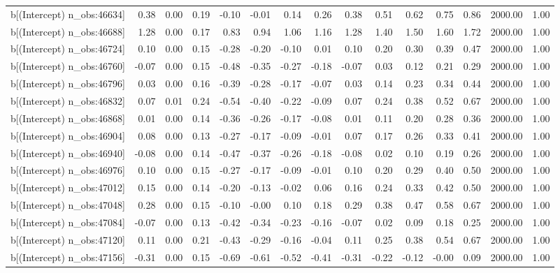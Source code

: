\begin{table}[ht]
\begin{tabular}{rrrrrrrrrrrrrrr}
  b[(Intercept) n\_obs:46634] & 0.38 & 0.00 & 0.19 & -0.10 & -0.01 & 0.14 & 0.26 & 0.38 & 0.51 & 0.62 & 0.75 & 0.86 & 2000.00 & 1.00 \\ 
  b[(Intercept) n\_obs:46688] & 1.28 & 0.00 & 0.17 & 0.83 & 0.94 & 1.06 & 1.16 & 1.28 & 1.40 & 1.50 & 1.60 & 1.72 & 2000.00 & 1.00 \\ 
  b[(Intercept) n\_obs:46724] & 0.10 & 0.00 & 0.15 & -0.28 & -0.20 & -0.10 & 0.01 & 0.10 & 0.20 & 0.30 & 0.39 & 0.47 & 2000.00 & 1.00 \\ 
  b[(Intercept) n\_obs:46760] & -0.07 & 0.00 & 0.15 & -0.48 & -0.35 & -0.27 & -0.18 & -0.07 & 0.03 & 0.12 & 0.21 & 0.29 & 2000.00 & 1.00 \\ 
  b[(Intercept) n\_obs:46796] & 0.03 & 0.00 & 0.16 & -0.39 & -0.28 & -0.17 & -0.07 & 0.03 & 0.14 & 0.23 & 0.34 & 0.44 & 2000.00 & 1.00 \\ 
  b[(Intercept) n\_obs:46832] & 0.07 & 0.01 & 0.24 & -0.54 & -0.40 & -0.22 & -0.09 & 0.07 & 0.24 & 0.38 & 0.52 & 0.67 & 2000.00 & 1.00 \\ 
  b[(Intercept) n\_obs:46868] & 0.01 & 0.00 & 0.14 & -0.36 & -0.26 & -0.17 & -0.08 & 0.01 & 0.11 & 0.20 & 0.28 & 0.36 & 2000.00 & 1.00 \\ 
  b[(Intercept) n\_obs:46904] & 0.08 & 0.00 & 0.13 & -0.27 & -0.17 & -0.09 & -0.01 & 0.07 & 0.17 & 0.26 & 0.33 & 0.41 & 2000.00 & 1.00 \\ 
  b[(Intercept) n\_obs:46940] & -0.08 & 0.00 & 0.14 & -0.47 & -0.37 & -0.26 & -0.18 & -0.08 & 0.02 & 0.10 & 0.19 & 0.26 & 2000.00 & 1.00 \\ 
  b[(Intercept) n\_obs:46976] & 0.10 & 0.00 & 0.15 & -0.27 & -0.17 & -0.09 & -0.01 & 0.10 & 0.20 & 0.29 & 0.40 & 0.50 & 2000.00 & 1.00 \\ 
  b[(Intercept) n\_obs:47012] & 0.15 & 0.00 & 0.14 & -0.20 & -0.13 & -0.02 & 0.06 & 0.16 & 0.24 & 0.33 & 0.42 & 0.50 & 2000.00 & 1.00 \\ 
  b[(Intercept) n\_obs:47048] & 0.28 & 0.00 & 0.15 & -0.10 & -0.00 & 0.10 & 0.18 & 0.29 & 0.38 & 0.47 & 0.58 & 0.67 & 2000.00 & 1.00 \\ 
  b[(Intercept) n\_obs:47084] & -0.07 & 0.00 & 0.13 & -0.42 & -0.34 & -0.23 & -0.16 & -0.07 & 0.02 & 0.09 & 0.18 & 0.25 & 2000.00 & 1.00 \\ 
  b[(Intercept) n\_obs:47120] & 0.11 & 0.00 & 0.21 & -0.43 & -0.29 & -0.16 & -0.04 & 0.11 & 0.25 & 0.38 & 0.54 & 0.67 & 2000.00 & 1.00 \\ 
  b[(Intercept) n\_obs:47156] & -0.31 & 0.00 & 0.15 & -0.69 & -0.61 & -0.52 & -0.41 & -0.31 & -0.22 & -0.12 & -0.00 & 0.09 & 2000.00 & 1.00 \\ 

\end{tabular}
\end{table}
